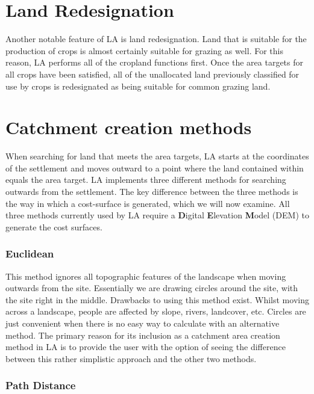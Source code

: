 \section{Land Redesignation}
Another notable feature of LA is land redesignation.  Land that is suitable for
the production of crops is almost certainly suitable for grazing as well.  For
this reason, LA performs all of the cropland functions first.  Once the area
targets for all crops have been satisfied, all of the unallocated land
previously classified for use by crops is redesignated as being suitable for
common grazing land. 

\section{Catchment creation methods} 

When searching for land that meets the area targets, LA starts at
the coordinates of the settlement and moves outward to a point where the land
contained within equals the area target.  LA implements three
different methods for searching outwards from the settlement.  The key
difference between the three methods is the way in which a cost-surface is
generated, which we will now examine.  All three methods currently used by LA
require a \textbf{D}igital \textbf{E}levation \textbf{M}odel (DEM) to generate
the cost surfaces.

  \subsubsection{Euclidean} \label{subsection:Euclidean} 
  
  This method ignores all topographic features of the landscape when moving
  outwards from the site.  Essentially we are drawing circles around the site,
  with the site right in the middle.  Drawbacks to using this method exist.
  Whilst moving across a landscape, people are affected by slope, rivers,
  landcover, etc.  Circles are just convenient when there is no easy way to
  calculate with an alternative method.  The primary reason for its inclusion
  as a catchment area creation method in LA is to provide the user
  with the option of seeing the difference between this rather simplistic
  approach and the other two methods.

  \subsubsection{Path Distance}
  
